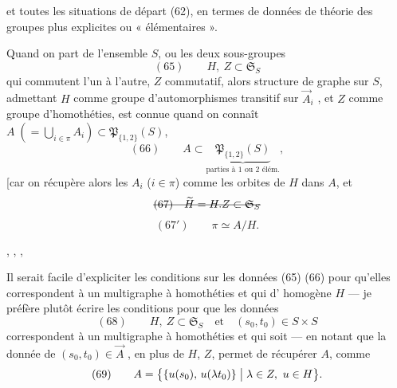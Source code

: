 \documentclass[11pt,a4paper]{article}
\begin{document}

et toutes les situations de départ (62), en termes de \struck{\ill{}} données de théorie des
groupes plus explicites ou « élémentaires ».

Quand on part de l'ensemble $S$, ou les deux sous-groupes
\[
(65)\qquad H,\ Z \subset \mathfrak{S}_S
\]
qui commutent l'un à l'autre, $Z$ commutatif, alors   structure de
graphe  sur $S$, admettant $H$ comme groupe
d'automorphismes transitif sur  $\vec{A}_i$ , et $Z$ comme groupe
d'homothéties, est connue quand on connaît 
$A \;(= \bigcup_{i\in\pi} A_i) \subset \mathfrak{P}_{\{1,2\}}(S)$,
\[
(66)\qquad A \subset \underbrace{\mathfrak{P}_{\{1,2\}}(S)}_{\text{parties à 1 ou 2 élém.}} ,
\]
 [car on récupère
alors les $A_i$ ($i\in\pi$) comme les orbites de $H$ dans $A$, et \ill{}
\[
\text{\struck{$(67)\quad \widetilde{H} = H.Z \subset \mathfrak{S}_S$}}
\]
\[
(67')\qquad \pi \simeq A/H .
\]

, ,    \ill{} ,   \struck{\ill{}}


Il serait facile d'expliciter les conditions sur les données (65) (66) pour qu'elles
correspondent à un multigraphe à homothéties et qui d' homogène $H$ — je préfère
plutôt écrire les conditions pour que les données
\[
(68)\qquad H,\ Z \subset \mathfrak{S}_S \quad\text{et}\quad (s_0,t_0)\in S\times S
\]
correspondent à un multigraphe à homothéties et qui soit  \struck{\ill{}}  — en notant que
la donnée de $(s_0,t_0)\in\vec{A}$ , en plus de $H$, $Z$, permet de
récupérer $A$, comme
\[
(69)\qquad A = \bigl\{\{u(s_0),\, u(\lambda t_0)\} \bigm| \lambda\in Z,\ u\in H \bigr\} .
\]
\end{document}
